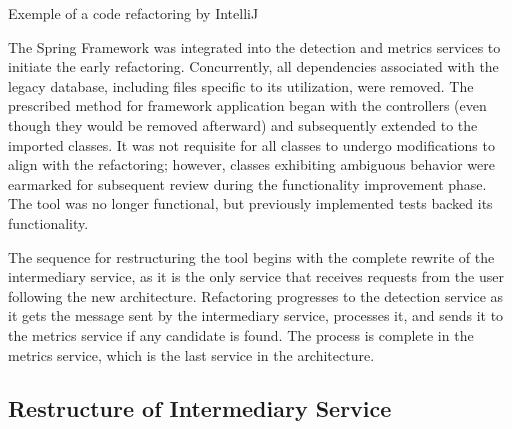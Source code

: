 \begin{algorithm}[!htbp]
\caption{Exemple of a code refactoring by IntelliJ}%
\label{alg-intellij}
\begin{algorithmic}[1]
 
 
\end{algorithmic}
\end{algorithm}
\FloatBarrier

The Spring Framework was integrated into the detection and metrics services to initiate the early refactoring. Concurrently, all dependencies associated with the legacy database, including files specific to its utilization, were removed. The prescribed method for framework application began with the controllers (even though they would be removed afterward) and subsequently extended to the imported classes. It was not requisite for all classes to undergo modifications to align with the refactoring; however, classes exhibiting ambiguous behavior were earmarked for subsequent review during the functionality improvement phase. The tool was no longer functional, but previously implemented tests backed its functionality.

The sequence for restructuring the tool begins with the complete rewrite of the intermediary service, as it is the only service that receives requests from the user following the new architecture. Refactoring progresses to the detection service as it gets the message sent by the intermediary service, processes it, and sends it to the metrics service if any candidate is found. The process is complete in the metrics service, which is the last service in the architecture.



\subsection{Restructure of Intermediary Service}
\label{sub-restruct-intermediary}

